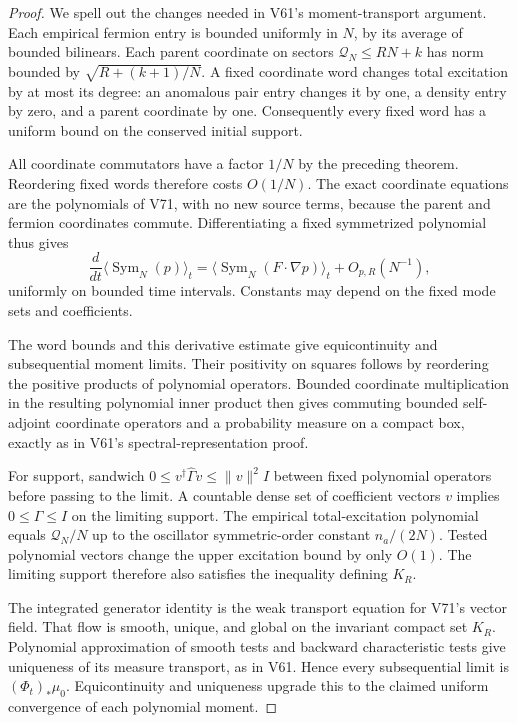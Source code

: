 \documentclass[11pt]{article}
\theoremstyle{remark}
\begin{document}
\begin{proof}
We spell out the changes needed in V61's moment-transport
argument.  Each empirical fermion entry is bounded
uniformly in \(N\), by its average of bounded bilinears.
Each parent coordinate on sectors \(\mathcal Q_N\leq RN+k\)
has norm bounded by \(\sqrt{R+(k+1)/N}\).
A fixed coordinate word changes total excitation by
at most its degree: an anomalous pair entry changes
it by one, a density entry by zero, and a parent
coordinate by one.  Consequently every fixed word
has a uniform bound on the conserved initial support.

All coordinate commutators have a factor \(1/N\)
by the preceding theorem.  Reordering fixed words
therefore costs \(O(1/N)\).  The exact coordinate
equations are the polynomials of V71, with no new
source terms, because the parent and fermion
coordinates commute.  Differentiating a fixed
symmetrized polynomial thus gives
\[
 \frac d{dt}\langle\operatorname{Sym}_N(p)\rangle_t
   =\langle\operatorname{Sym}_N(F\cdot\nabla p)\rangle_t
                                       +O_{p,R}(N^{-1}),
\]
uniformly on bounded time intervals.  Constants
may depend on the fixed mode sets and coefficients.

The word bounds and this derivative estimate give
equicontinuity and subsequential moment limits.
Their positivity on squares follows by reordering
the positive products of polynomial operators.
Bounded coordinate multiplication in the resulting
polynomial inner product then gives commuting
bounded self-adjoint coordinate operators and a
probability measure on a compact box, exactly as
in V61's spectral-representation proof.

For support, sandwich
\(0\leq v^\dagger\widehat\Gamma v\leq\|v\|^2I\)
between fixed polynomial operators before passing
to the limit.  A countable dense set of coefficient
vectors \(v\) implies \(0\leq\Gamma\leq I\) on the
limiting support.  The empirical total-excitation
polynomial equals \(\mathcal Q_N/N\) up to the
oscillator symmetric-order constant
\(n_a/(2N)\).  Tested polynomial vectors change
the upper excitation bound by only \(O(1)\).
The limiting support therefore also satisfies the
inequality defining \(K_R\).

The integrated generator identity is the weak
transport equation for V71's vector field.  That
flow is smooth, unique, and global on the invariant
compact set \(K_R\).  Polynomial approximation of
smooth tests and backward characteristic tests
give uniqueness of its measure transport, as in
V61.  Hence every subsequential limit is
\((\Phi_t)_*\mu_0\).  Equicontinuity and uniqueness
upgrade this to the claimed uniform convergence
of each polynomial moment.
\end{proof}
\end{document}
